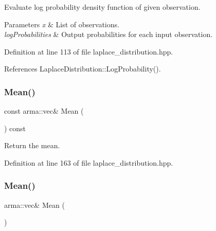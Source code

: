 Evaluate log probability density function of given observation. 


\begin{DoxyParams}{Parameters}
{\em x} & List of observations. \\
\hline
{\em log\+Probabilities} & Output probabilities for each input observation. \\
\hline
\end{DoxyParams}


Definition at line 113 of file laplace\+\_\+distribution.\+hpp.



References Laplace\+Distribution\+::\+Log\+Probability().

\mbox{\label{classmlpack_1_1distribution_1_1LaplaceDistribution_a6db5f5d76cbd055347cecd9ca90eea86}} 
\subsubsection{Mean()\hspace{0.1cm}{\footnotesize\ttfamily [1/2]}}
{\footnotesize\ttfamily const arma\+::vec\& Mean (\begin{DoxyParamCaption}{ }\end{DoxyParamCaption}) const\hspace{0.3cm}{\ttfamily [inline]}}



Return the mean. 



Definition at line 163 of file laplace\+\_\+distribution.\+hpp.

\mbox{\label{classmlpack_1_1distribution_1_1LaplaceDistribution_a94becb1cd872c0334328c37f130db253}} 
\subsubsection{Mean()\hspace{0.1cm}{\footnotesize\ttfamily [2/2]}}
{\footnotesize\ttfamily arma\+::vec\& Mean (\begin{DoxyParamCaption}{ }\end{DoxyParamCaption})\hspace{0.3cm}{\ttfamily [inline]}}



